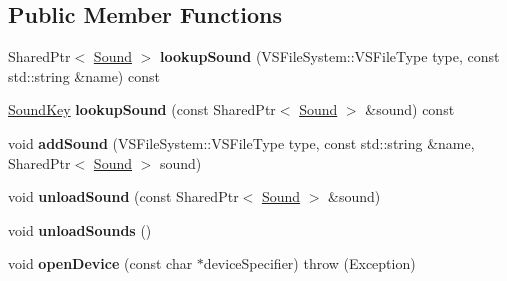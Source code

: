 \subsection*{Public Member Functions}
\begin{DoxyCompactItemize}
\item 
Shared\+Ptr$<$ \hyperlink{classAudio_1_1Sound}{Sound} $>$ {\bfseries lookup\+Sound} (V\+S\+File\+System\+::\+V\+S\+File\+Type type, const std\+::string \&name) const \hypertarget{structAudio_1_1____impl_1_1OpenAL_1_1RendererData_adb199ffb70f50060bbafceabadcf2bf3}{}\label{structAudio_1_1____impl_1_1OpenAL_1_1RendererData_adb199ffb70f50060bbafceabadcf2bf3}

\item 
\hyperlink{classAudio_1_1____impl_1_1OpenAL_1_1RendererData_1_1SoundKey}{Sound\+Key} {\bfseries lookup\+Sound} (const Shared\+Ptr$<$ \hyperlink{classAudio_1_1Sound}{Sound} $>$ \&sound) const \hypertarget{structAudio_1_1____impl_1_1OpenAL_1_1RendererData_a8ec58804eb0a15dd437cb13c23847267}{}\label{structAudio_1_1____impl_1_1OpenAL_1_1RendererData_a8ec58804eb0a15dd437cb13c23847267}

\item 
void {\bfseries add\+Sound} (V\+S\+File\+System\+::\+V\+S\+File\+Type type, const std\+::string \&name, Shared\+Ptr$<$ \hyperlink{classAudio_1_1Sound}{Sound} $>$ sound)\hypertarget{structAudio_1_1____impl_1_1OpenAL_1_1RendererData_a370fd7600fad183883b487c69955be8a}{}\label{structAudio_1_1____impl_1_1OpenAL_1_1RendererData_a370fd7600fad183883b487c69955be8a}

\item 
void {\bfseries unload\+Sound} (const Shared\+Ptr$<$ \hyperlink{classAudio_1_1Sound}{Sound} $>$ \&sound)\hypertarget{structAudio_1_1____impl_1_1OpenAL_1_1RendererData_a96ff45c6f57ca60bea1773eeec067ef6}{}\label{structAudio_1_1____impl_1_1OpenAL_1_1RendererData_a96ff45c6f57ca60bea1773eeec067ef6}

\item 
void {\bfseries unload\+Sounds} ()\hypertarget{structAudio_1_1____impl_1_1OpenAL_1_1RendererData_ac52ce1bb3e95867eda5ca6c5b008000b}{}\label{structAudio_1_1____impl_1_1OpenAL_1_1RendererData_ac52ce1bb3e95867eda5ca6c5b008000b}

\item 
void {\bfseries open\+Device} (const char $\ast$device\+Specifier)  throw (\+Exception)\hypertarget{structAudio_1_1____impl_1_1OpenAL_1_1RendererData_a6c650f80d9e7a728beadb4f5c1d4a02e}{}\label{structAudio_1_1____impl_1_1OpenAL_1_1RendererData_a6c650f80d9e7a728beadb4f5c1d4a02e}


\end{DoxyCompactItemize}
